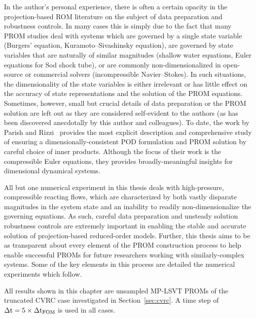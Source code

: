 In the author's personal experience, there is often a certain opacity in the projection-based ROM literature on the subject of data preparation and robustness controls. In many cases this is simply due to the fact that many PROM studies deal with systems which are governed by a single state variable (Burgers' equation, Kuramoto--Sivashinsky equation), are governed by state variables that are naturally of similar magnitudes (shallow water equations, Euler equations for Sod shock tube), or are commonly non-dimensionalized in open-source or commercial solvers (incompressible Navier--Stokes). In such situations, the dimensionality of the state variables is either irrelevant or has little effect on the accuracy of state representations and the solution of the PROM equations. Sometimes, however, small but crucial details of data preparation or the PROM solution are left out as they are considered self-evident to the authors (as has been discovered anecdotally by this author and colleagues). To date, the work by Parish and Rizzi~\cite{Parish2022} provides the most explicit description and comprehensive study of ensuring a dimensionally-consistent POD formulation and PROM solution by careful choice of inner products. Although the focus of their work is the compressible Euler equations, they provides broadly-meaningful insights for dimensional dynamical systems.

All but one numerical experiment in this thesis deals with high-pressure, compressible reacting flows, which are characterized by both vastly disparate magnitudes in the system state and an inability to readily non-dimensionalize the governing equations. As such, careful data preparation and unsteady solution robustness controls are extremely important in enabling the stable and accurate solution of projection-based reduced-order models. Further, this thesis aims to be as transparent about every element of the PROM construction process to help enable successful PROMs for future researchers working with similarly-complex systems. Some of the key elements in this process are detailed the numerical experiments which follow.

All results shown in this chapter are unsampled MP-LSVT PROMs of the truncated CVRC case investigated in Section~\ref{sec:cvrc}. A time step of $\Delta \text{t} = 5 \times \Delta \text{t}_{\text{FOM}}$ is used in all cases.